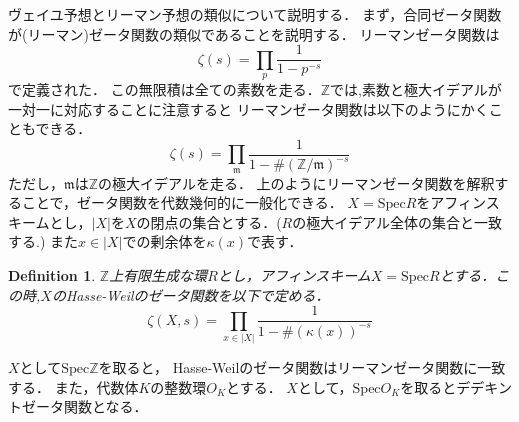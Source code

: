 \documentclass{ujarticle}
\newtheorem{dfn}[thm]{Definition}
\begin{document}
ヴェイユ予想とリーマン予想の類似について説明する．
まず，合同ゼータ関数が(リーマン)ゼータ関数の類似であることを説明する．
リーマンゼータ関数は
\begin{equation*}
 \zeta(s)= \prod_{p}\frac{1}{1-p^{-s}}
\end{equation*}
で定義された．
この無限積は全ての素数を走る．$\mathbb{Z}$では,素数と極大イデアルが一対一に対応することに注意すると
リーマンゼータ関数は以下のようにかくこともできる．
\begin{equation*}
 \zeta(s) = \prod_{\mathfrak{m}}
 \frac{1}{1-{\#(\mathbb{Z}/\mathfrak{m})}^{-s}}
\end{equation*}
ただし，$\mathfrak{m}$は$\mathbb{Z}$の極大イデアルを走る．
上のようにリーマンゼータ関数を解釈することで，ゼータ関数を代数幾何的に一般化できる．
$X=\mathrm{Spec}R$をアフィンスキームとし，$|X|$を$X$の閉点の集合とする．($R$の極大イデアル全体の集合と一致する.)
また$x \in |X|$での剰余体を$\kappa(x)$で表す．
\begin{dfn}
  $\mathbb{Z}$上有限生成な環$R$とし，アフィンスキーム$X=\mathrm{Spec}R$とする．この時,$X$のHasse-Weilのゼータ関数を以下で定める．
  \begin{equation*}
   \zeta(X,s)=\prod_{x \in |X|} \frac{1}{1-\#(\kappa(x))^{-s}}
  \end{equation*}
\end{dfn}
$X$として$\mathrm{Spec}\mathbb{Z}$を取ると，
Hasse-Weilのゼータ関数はリーマンゼータ関数に一致する．
また，代数体$K$の整数環$O_K$とする．
$X$として，$\mathrm{Spec}O_K$を取るとデデキントゼータ関数となる．
\end{document}

